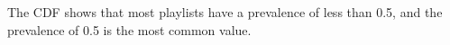The CDF shows that most playlists have a prevalence of less than 0.5, and the prevalence of 0.5 is the most common value.